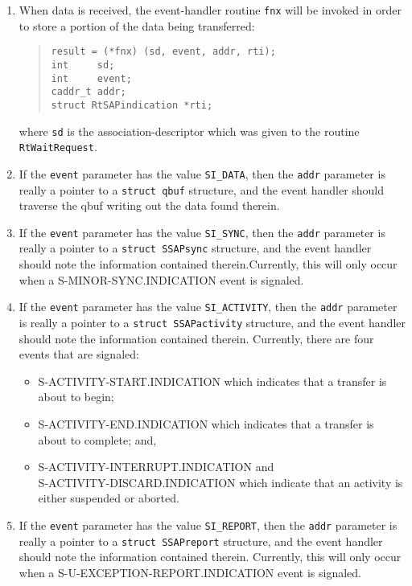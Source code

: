 \begin{enumerate}
\item	When data is received, the event-handler routine \verb"fnx" will 
	be invoked
	in order to store a portion of the data being transferred:
\begin{quote}\small\begin{verbatim}
result = (*fnx) (sd, event, addr, rti);
int     sd;
int     event;
caddr_t addr;
struct RtSAPindication *rti;
\end{verbatim}
\end{quote}
where \verb"sd" is the association-descriptor which was given to the routine
\verb"RtWaitRequest".

\item	If the \verb"event" parameter has the value \verb"SI_DATA",
	then the \verb"addr" parameter is really a pointer to a
	\verb"struct qbuf" structure, and the event handler should
	traverse the qbuf writing out the data found therein.

\item	If the \verb"event" parameter has the value \verb"SI_SYNC",
	then the \verb"addr" parameter is really a pointer to a 
	\verb"struct SSAPsync" structure, and the event handler should note
	the information contained therein.Currently, this will only
	occur when a {\sf S-MINOR-SYNC.INDICATION\/} event is signaled.

\item	If the \verb"event" parameter has the value \verb"SI_ACTIVITY",
	then the \verb"addr" parameter is really a pointer to a
	\verb"struct SSAPactivity" structure, and the event handler should note
	the information contained therein.  Currently, there are four events
	that are signaled:
    \begin{itemize}
    \item	{\sf S-ACTIVITY-START.INDICATION\/} which indicates that a
		transfer is about to begin;

    \item	{\sf S-ACTIVITY-END.INDICATION\/} which indicates that a
		transfer is about to complete; and,

    \item	{\sf S-ACTIVITY-INTERRUPT.IN\-DI\-CA\-TION\/} and\\ %
		{\sf S-ACTIVITY-DIS\-CARD.IN\-DI\-CA\-TION\/} which indicate
		that an activity is either suspended or aborted.
    \end{itemize}

\item	If the \verb"event" parameter has the value \verb"SI_REPORT",
	then the \verb"addr" parameter is really a pointer to a
	\verb"struct SSAPreport" structure, and the event handler should note
	the information contained therein.  Currently, this will only
	occur when a {\sf S-U-EXCEPTION-REPORT.IN\-DI\-CA\-TION\/} event is
	signaled.


\end{enumerate}
